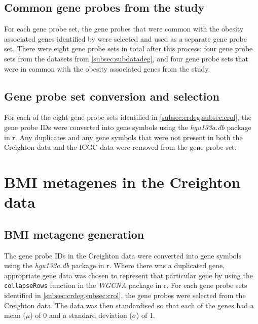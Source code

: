 \subsection{Common gene probes from the \citet{Creighton2012} study}
\label{subsec:crol}

For each gene probe set, the gene probes that were common with the obesity associated genes identified by \citet{Creighton2012} were selected and used as a separate gene probe set.
There were eight gene probe sets in total after this process: four gene probe sets from the datasets from \cref{subsec:subdatadeg}, and four gene probe sets that were in common with the obesity associated genes from the \citet{Creighton2012} study.


\subsection{Gene probe set conversion and selection}
\label{subsec:gpconv}

For each of the eight gene probe sets identified in \cref{subsec:crdeg,subsec:crol}, the gene probe IDs were converted into gene symbols using the \textit{hgu133a.db} package in \gls{r}.
Any duplicates and any gene symbols that were not present in both the Creighton data and the ICGC data were removed from the gene probe set.

\section{BMI metagenes in the Creighton data}
\label{sec:bmidegmetacr}

\subsection{BMI metagene generation}
\label{subsec:bmimetagen}

The gene probe IDs in the Creighton data were converted into gene symbols using the \textit{hgu133a.db} package in \gls{r}.
Where there was a duplicated gene, appropriate gene data was chosen to represent that particular gene by using the \texttt{collapseRows} function in the \textit{WGCNA} package in \gls{r}.
For each gene probe sets identified in \cref{subsec:crdeg,subsec:crol}, the gene probes were selected from the Creighton data.
The data was then standardised so that each of the genes had a mean ($\mu$) of 0 and a standard deviation ($\sigma$) of 1.

